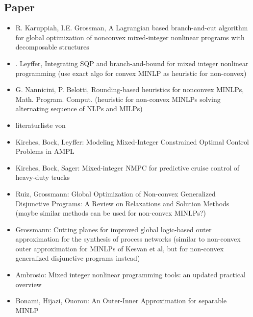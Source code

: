 \documentclass{article}
\begin{document}
\subsection{Paper}
\begin{itemize}
\item R. Karuppiah, I.E. Grossman, A Lagrangian based branch-and-cut algorithm
for global optimization of nonconvex mixed-integer nonlinear programs
with decomposable structures
\item . Leyffer, Integrating SQP and branch-and-bound for mixed integer
nonlinear programming (use exact algo for convex MINLP as heuristic for non-convex)
\item G. Nannicini, P. Belotti, Rounding-based heuristics for nonconvex MINLPs,
Math. Program. Comput. (heuristic for non-convex MINLPs solving alternating sequence of NLPs and MILPs)
\item literaturliste von \cite{burer2012non}
\item Kirches, Bock, Leyffer: Modeling Mixed-Integer Constrained
Optimal Control Problems in AMPL
\item Kirches, Bock, Sager: Mixed-integer NMPC for predictive cruise control of heavy-duty trucks
\item Ruiz, Grossmann: Global Optimization of Non-convex Generalized
Disjunctive Programs: A Review on Relaxations and Solution Methods (maybe similar methods can be used for non-convex MINLPs?)
\item Grossmann: Cutting planes for improved global logic-based outer approximation
for the synthesis of process networks (similar to non-convex outer approximation for MINLPs of Kesvan et al, but for non-convex generalized disjunctive programs instead)
\item Ambrosio: Mixed integer nonlinear programming tools: an updated practical overview
\item Bonami, Hijazi, Ouorou: An Outer-Inner Approximation for separable MINLP
\end{itemize}
\end{document}
